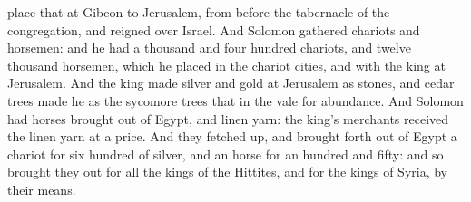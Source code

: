 {place that
{} at
Gibeon to
Jerusalem, from
before the
tabernacle of the
congregation, and
reigned over
Israel.
And
Solomon
gathered
chariots and
horsemen: and he had a
thousand and
four
hundred
chariots, and
twelve
thousand
horsemen, which he
placed in the
chariot
cities, and with the
king at
Jerusalem.
And the
king
made
silver and
gold at
Jerusalem
{} as
stones, and cedar
trees
made he as the sycomore
trees that
{} in the
vale for
abundance.
And
Solomon had
horses
brought out of
Egypt, and linen
yarn: the
king’s
merchants
received the linen
yarn at a
price.
And they fetched
up, and brought
forth out of
Egypt a
chariot for
six
hundred
{} of
silver, and an
horse for an
hundred and
fifty: and so brought they
out
{} for all the
kings of the
Hittites, and for the
kings of
Syria, by their
means.

}
